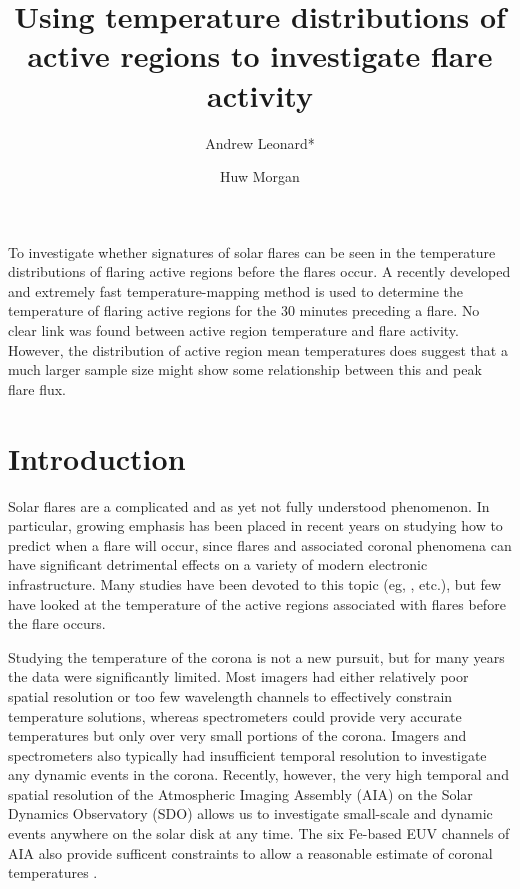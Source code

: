 \documentclass[referee,a4paper,12pt]{swsc}
\author{Andrew Leonard*
        \and Huw Morgan}
\institute{Institute of Mathematics, Physics and Computer Science, Aberystwyth University, Ceredigion, SY23 3BZ, Wales\\
					 \email{\href{mailto:ajl7@aber.ac.uk}{ajl7@aber.ac.uk}}}
\title{Using temperature distributions of active regions to investigate flare activity}
\begin{document}
\begin{linenumbers}


\abstract
	{}
	{To investigate whether signatures of solar flares can be seen in the temperature distributions of flaring active regions before the flares occur.}
	{A recently developed and extremely fast temperature-mapping method is used to determine the temperature of flaring active regions for the 30 minutes preceding a flare.}
	{No clear link was found between active region temperature and flare activity. However, the distribution of active region mean temperatures does suggest that a much larger sample size might show some relationship between this and peak flare flux.}
	{}
\keywords{}

\maketitle

\section{Introduction}
Solar flares are a complicated and as yet not fully understood phenomenon.
In particular, growing emphasis has been placed in recent years on studying how to predict when a flare will occur, since flares and associated coronal phenomena can have significant detrimental effects on a variety of modern electronic infrastructure.
Many studies have been devoted to this topic (eg, \citealt{Korsos2014, Ahmed2011, Bloomfield2012}, etc.), but few have looked at the temperature of the active regions associated with flares before the flare occurs.

Studying the temperature of the corona is not a new pursuit, but for many years the data were significantly limited.
Most imagers had either relatively poor spatial resolution or too few wavelength channels to effectively constrain temperature solutions, whereas spectrometers could provide very accurate temperatures but only over very small portions of the corona.
Imagers and spectrometers also typically had insufficient temporal resolution to investigate any dynamic events in the corona.
Recently, however, the very high temporal and spatial resolution of the Atmospheric Imaging Assembly (AIA) on the Solar Dynamics Observatory (SDO) allows us to investigate small-scale and dynamic events anywhere on the solar disk at any time.
The six Fe-based EUV channels of AIA also provide sufficent constraints to allow a reasonable estimate of coronal temperatures \citep{Guennou2012, Guennou2012a}.


\end{linenumbers}
\end{document}
